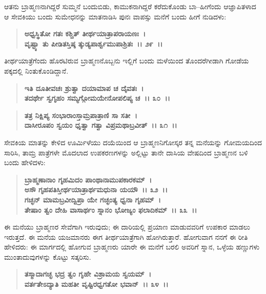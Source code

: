 ಆತನು ಬ್ರಾಹ್ಮಣನಾಗಿದ್ದರೆ ಸುಮ್ಮನೆ ಬಂದುಬಿಡು, ಕಾಮುಕನಾಗಿದ್ದರೆ ಕರೆದುಕೊಂಡು ಬಾ–ಹೀಗೆಂದು ಆಜ್ಞಾಪಿತಳಾದ ಆ ಸೇವಕಿಯು ಬಂದು ಸುಮೇಧನನ್ನು ಮಾತನಾಡಿಸಿ ಪುನಃ ವಾಪಸ್ಸು ಮನೆಗೆ ಬಂದು ಹೀಗೆ ನುಡಿದಳು:

\begin{verse}
\textbf{ಅಧ್ವಸ್ಥಿತೋ ಗತಃ ಕಶ್ಚಿತ್ ತೀರ್ಥಯಾತ್ರಾಪರಾಯಣಃ~।}\\\textbf{ವೃಷ್ಟ್ಯಾ ತು ಪೀಡಿತಸ್ತಿಷ್ಠ ತ್ಕುಡ್ಯಪಾರ್ಶ್ವಮುಪಾಶ್ರಿತಃ~।। ೨೯~।।}
\end{verse}

ತೀರ್ಥಯಾತ್ರೆಗೆಂದು ಹೊರಟಿರುವ ಬ್ರಾಹ್ಮಣನೊಬ್ಬನು ಇಲ್ಲಿಗೆ ಬಂದು ಮಳೆಯಿಂದ ತೊಂದರೆಗೀಡಾಗಿ ಗೋಡೆಯ ಪಕ್ಕದಲ್ಲಿ ನಿಂತುಕೊಂಡಿದ್ದಾನೆ.

\begin{verse}
\textbf{ಇತಿ ದೂತೀವಚಃ ಶ್ರುತ್ವಾ ದಯಾಮಾಪ ಚ ದೈವತಃ~।}\\\textbf{ತದರ್ಥೇ ಸ್ವಗೃಹಂ ಸಮ್ಯಗ್ಗೋಮಯೇನೋಪಲಿಪ್ಯ ಚ~।। ೩೦~।। }
\end{verse}

\begin{verse}
\textbf{ತತ್ರ ನಿಕ್ಷಿಪ್ಯ ಸಂಭಾರಾಂಸ್ತಾಮ್ರಪಾತ್ರಾಣಿ ಸಾ ಸತೀ~।}\\\textbf{ದಾಸೀರೂಪಂ ಸ್ವಯಂ ಧೃತ್ವಾ ಗತ್ವಾ ವಿಪ್ರಮಥಾಬ್ರವೀತ್~।। ೩೧~।।}
\end{verse}

ಸೇವಕಿಯ ಮಾತನ್ನು ಕೇಳಿದ ಊರ್ಮಿಳೆಯು ದಯೆಯಿಂದ ಆ ಬ್ರಾಹ್ಮಣನಿಗೋಸ್ಕರ ತನ್ನ ಮನೆಯನ್ನು ಗೋಮಯದಿಂದ ಸಾರಿಸಿ, ತಾಮ್ರ ಪಾತ್ರೆಗಳೇ ಮೊದಲಾದ ಉಪಕರಣಗಳನ್ನು ಅಲ್ಲಿಟ್ಟು ತಾನೇ ದಾಸಿಯ ವೇಷದಿಂದ ಬ್ರಾಹ್ಮಣನ ಬಳಿ ಬಂದು ಹೇಳಿದಳು:

\begin{verse}
\textbf{ಬ್ರಾಹ್ಮಣಾನಾಂ ಗೃಹಮಿದಂ ಪಾಂಥಾನಾಮುಪಕಾರಕಮ್~।}\\\textbf{ಅಸೌ ಗೃಹಪತಿಸ್ತೀರ್ಥಯಾತ್ರಾರ್ಥಮಧುನಾ ಯಯೌ~।। ೩೨~।। }\\\textbf{ಗಚ್ಛನ್ ಮಾಮಬ್ರವೀದ್ವಿಪ್ರಾ ಯೇ ಗಚ್ಛಂತ್ಯ ಧ್ವನಾ ಗೃಹಮ್~।} \\\textbf{ತೇಷಾಂ ತ್ವಂ ದೇಹಿ ವಾಸಾರ್ಥಂ ಸ್ನಾನಂ ಭೋಜ್ಯಂ ಫಲಾದಿಕಮ್~।। ೩೩~।।}
\end{verse}

ಈ ಮನೆಯು ಬ್ರಾಹ್ಮಣರ ಸೇವೆಗಾಗಿ ಇರುವುದು; ಈ ದಾರಿಯಲ್ಲಿ ಪ್ರಯಾಣ ಮಾಡುವವರಿಗೆ ಉಪಕಾರ ಮಾಡಲು ಇರುತ್ತದೆ. ಈ ಮನೆಯ ಯಜಮಾನರು ಈಗ ತೀರ್ಥಯಾತ್ರೆಗಾಗಿ ಹೋಗಿರುತ್ತಾರೆ. ಹೋಗುವಾಗ ನನಗೆ ಈ ರೀತಿ ಹೇಳಿದರು: ಈ ಮಾರ್ಗದಲ್ಲಿ ಹೋಗುವ ಬ್ರಾಹ್ಮಣರು ಯಾರೇ ಈ ಮನೆಗೆ ಬರಲಿ ಅವರಿಗೆ ಸ್ನಾನ, ಒಳ್ಳೆಯ ಹಣ್ಣುಗಳು ಮುಂತಾದುವುಗಳನ್ನು ಕೊಟ್ಟು ಸತ್ಕರಿಸು.

\begin{verse}
\textbf{ತಸ್ಮಾದಾಗಚ್ಛ ಭದ್ರ ತ್ವಂ ಗೃಹೇ ವಿಶ್ರಾಮಯ ಸ್ವಯಮ್~।}\\\textbf{ವರ್ತತೇಽದ್ಯಾತಿ ಮಹತೀ ವೃಷ್ಟಿರಧ್ವಗತೋ ಭವಾನ್~।। ೩೪~।। }
\end{verse}

